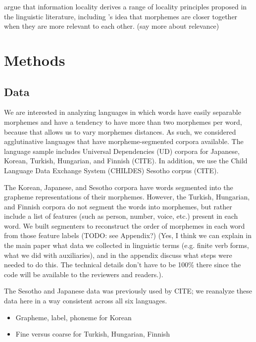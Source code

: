 \documentclass[11pt,letterpaper]{article}
\newcommand\mhahn[1]{{\color{red}(#1)}}
\newcommand\becky[1]{{\color{blue}(#1)}}
\begin{document}
\citet{Hahn2020modeling} argue that information locality derives a range of locality principles proposed in the linguistic literature, including \cite{bybee-morphology-1985}'s idea that morphemes are closer together when they are more relevant to each other.
\mhahn{say more about relevance}

\section{Methods}

\subsection{Data} %

We are interested in analyzing languages in which words have easily separable morphemes and have a tendency to have more than two morphemes per word, because that allows us to vary morphemes distances. As such, we considered agglutinative languages that have morpheme-segmented corpora available. The language sample includes Universal Dependencies (UD) corpora for Japanese, Korean, Turkish, Hungarian, and Finnish (CITE). In addition, we use the Child Language Data Exchange System (CHILDES) Sesotho corpus (CITE). 

The Korean, Japanese, and Sesotho corpora have words segmented into the grapheme representations of their morphemes. However, the Turkish, Hungarian, and Finnish corpora do not segment the words into morphemes, but rather include a list of features (such as person, number, voice, etc.) present in each word. We built segmenters to reconstruct the order of morphemes in each word from those feature labels \becky{TODO: see Appendix?} \mhahn{Yes, I think we can explain in the main paper what data we collected in linguistic terms (e.g. finite verb forms, what we did with auxiliaries), and in the appendix discuss what steps were needed to do this. The technical details don't have to be 100\% there since the code will be available to the reviewers and readers.}.

The Sesotho and Japanese data was previously used by CITE; we reanalyze these data here in a way consistent across all six languages.

\begin{itemize}
    \item Grapheme, label, phoneme for Korean
    \item Fine versus coarse for Turkish, Hungarian, Finnish
\end{itemize}
\end{document}

